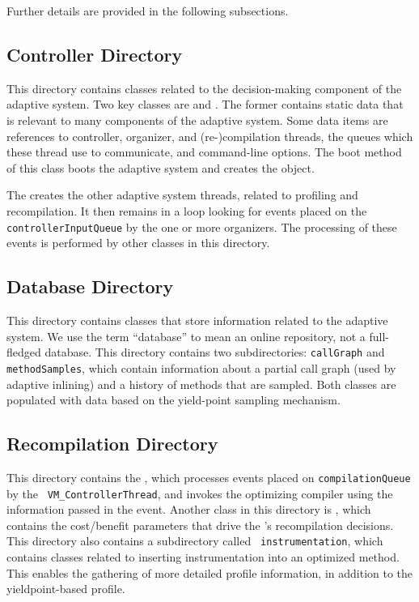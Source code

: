 Further details are provided in the following subsections.

\subsection{Controller Directory}
This directory contains classes related to 
the decision-making component of the adaptive system.
Two key classes are 
 and 
.  
The former contains static data that
is relevant to many components of the adaptive system.  Some data
items are references to controller, organizer, and
(re-)compilation threads, the queues which these thread use to 
communicate, and command-line options.  The boot method of this class
boots the adaptive system and creates the  
object. 

The  creates
the other adaptive system 
threads, related to profiling and recompilation.  It then remains in a
loop looking for events placed on the {\tt controllerInputQueue} by
the one or more organizers.  The processing of these events is
performed by other classes in this directory.

\subsection{Database Directory}
This directory contains classes that store information related to the
adaptive system.  We use the term ``database'' to mean an online
repository, not a full-fledged database. This directory contains two
subdirectories: 
{\tt callGraph} and {\tt methodSamples}, which contain information
about a partial call graph (used by adaptive inlining) and a history
of methods that are sampled.  Both classes are populated with data based
on the yield-point sampling mechanism.

\subsection{Recompilation Directory}
This directory contains the , which 
processes
events placed on {\tt com\-pi\-la\-tion\-Queue} by the {\tt
VM\-\_\-Con\-trol\-ler\-Thread}, and invokes the optimizing compiler using the
information passed in the event.  Another class in this directory is
, which contains the cost/benefit
parameters that drive the 's recompilation 
decisions. This directory also contains a subdirectory called {\tt
instrumentation}, which contains classes related to inserting
instrumentation into an optimized method.  This enables the gathering
of more detailed profile information, in addition to the
yieldpoint-based profile.

